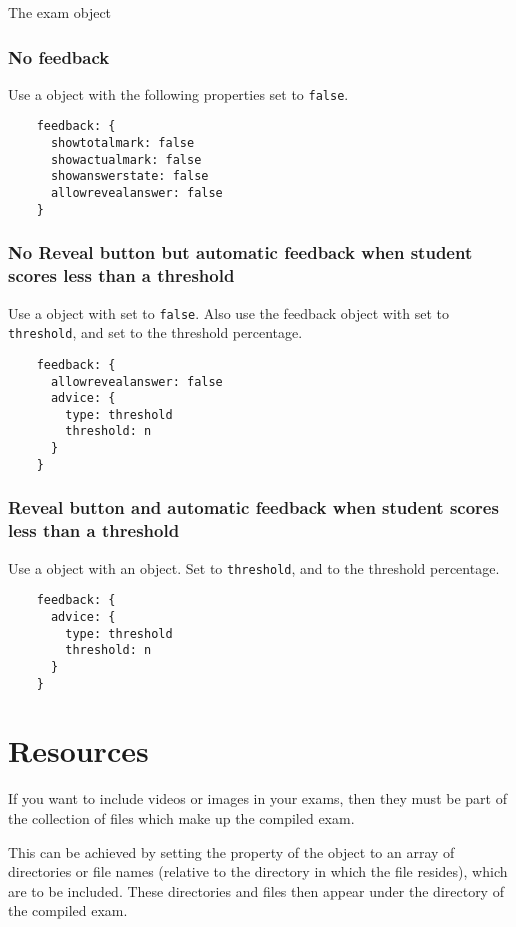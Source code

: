 \begin{chapter}{\label{cha:exam_object}The exam object}
  \subsubsection{No feedback}
  Use a  object with the following properties set to 
	\verb"false".
  \begin{Verbatim}
    feedback: {
      showtotalmark: false
      showactualmark: false
      showanswerstate: false
      allowrevealanswer: false
    }
  \end{Verbatim}

  \subsubsection{No Reveal button but automatic feedback when student scores
    less than a threshold}
  Use a  object with  set to
  \verb"false".  Also use the feedback  object with
   set to \verb"threshold", and  set to the
  threshold percentage.
  \begin{Verbatim}
    feedback: {
      allowrevealanswer: false
      advice: {
        type: threshold
        threshold: n
      }
    }
  \end{Verbatim}

  \subsubsection{Reveal button and automatic feedback when student scores less
    than a threshold}
  Use a  object with an  object.  Set
   to \verb"threshold", and  to the
  threshold percentage.
  \begin{Verbatim}
    feedback: {
      advice: {
        type: threshold
        threshold: n
      }
    }
  \end{Verbatim}

  \section{\label{sec:resources}Resources}
  If you want to include videos or images in your exams, then they must be part
  of the collection of files which make up the compiled exam.

  This can be achieved by setting the  property of the
   object to an array of directories or file names (relative
  to the directory in which the  file resides), which are to be
  included.  These directories and files then appear under the
   directory of the compiled exam.


\end{chapter}
